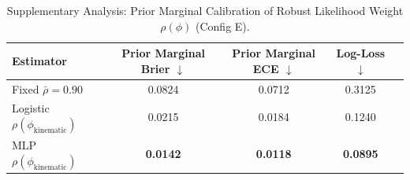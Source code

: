 \begin{table}[!t]
\caption{Supplementary Analysis: Prior Marginal Calibration of Robust Likelihood Weight $\rho(\phi)$ (Config E).}
\label{tab:appendix_rho}
\centering
\small
\begin{tabular}{lcccc}
\toprule
Estimator & Prior Marginal Brier $\downarrow$ & Prior Marginal ECE $\downarrow$ & Log-Loss $\downarrow$ \\
\midrule
Fixed $\bar{\rho} = 0.90$ & 0.0824 & 0.0712 & 0.3125 \\
Logistic $\rho(\phi_{\text{kinematic}})$ & 0.0215 & 0.0184 & 0.1240 \\
MLP $\rho(\phi_{\text{kinematic}})$ & \textbf{0.0142} & \textbf{0.0118} & \textbf{0.0895} \\
\bottomrule
\end{tabular}
\end{table}
